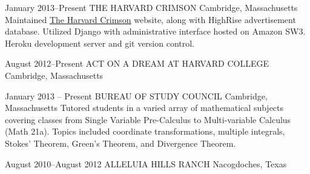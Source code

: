 \documentclass[]{friggeri-cv} %
\begin{document}
\entry
{January 2013--Present}
{THE HARVARD CRIMSON}
{Cambridge, Massachusetts}
{
{Maintained \href{http://thecrimson.com}{The Harvard Crimson} website, along with HighRise advertisement database. Utilized Django with administrative interface hosted on Amazon SW3. Heroku development server and git version control.}}

\begin{detailed}
\entry
{August 2012--Present}
{ACT ON A DREAM AT HARVARD COLLEGE}
{Cambridge, Massachusetts}
{}

\entry
{January 2013 -- Present}
{BUREAU OF STUDY COUNCIL}
{Cambridge, Massachusetts}
{
{Tutored students in a varied array of mathematical subjects covering classes from Single Variable Pre-Calculus to Multi-variable Calculus (Math 21a). Topics included coordinate transformations, multiple integrals, Stokes' Theorem, Green's Theorem, and Divergence Theorem.}}

\entry
{August 2010--August 2012}
{ALLELUIA HILLS RANCH}
{Nacogdoches, Texas}
{}
\end{detailed}
\end{document}
